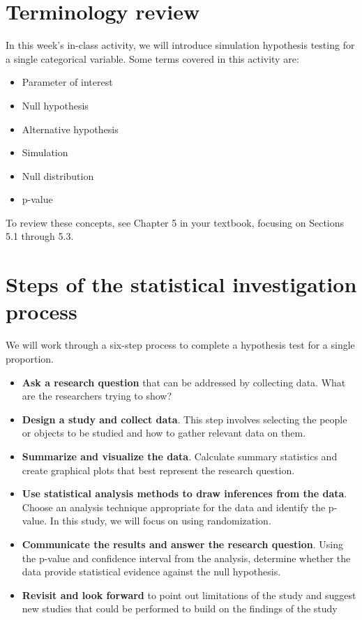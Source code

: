 \documentclass[
]{report}
\begin{document}
\hypertarget{terminology-review}{%
\section{Terminology review}\label{terminology-review}}

In this week's in-class activity, we will introduce simulation hypothesis testing for a single categorical variable. Some terms covered in this activity are:

\begin{itemize}
\item
  Parameter of interest
\item
  Null hypothesis
\item
  Alternative hypothesis
\item
  Simulation
\item
  Null distribution
\item
  p-value
\end{itemize}

To review these concepts, see Chapter 5 in your textbook, focusing on Sections 5.1 through 5.3.

\hypertarget{steps-of-the-statistical-investigation-process}{%
\section{Steps of the statistical investigation process}\label{steps-of-the-statistical-investigation-process}}

We will work through a six-step process to complete a hypothesis test for a single proportion.

\begin{itemize}
\item
  \textbf{Ask a research question} that can be addressed by collecting data. What are the researchers trying to show?
\item
  \textbf{Design a study and collect data}. This step involves selecting the people or objects to be studied and how to gather relevant data on them.
\item
  \textbf{Summarize and visualize the data}. Calculate summary statistics and create graphical plots that best represent the research question.
\item
  \textbf{Use statistical analysis methods to draw inferences from the data}. Choose an analysis technique appropriate for the data and identify the p-value. In this study, we will focus on using randomization.
\item
  \textbf{Communicate the results and answer the research question}. Using the p-value and confidence interval from the analysis, determine whether the data provide statistical evidence against the null hypothesis.
\item
  \textbf{Revisit and look forward} to point out limitations of the study and suggest new studies that could be performed to build on the findings of the study
\end{itemize}
\end{document}
